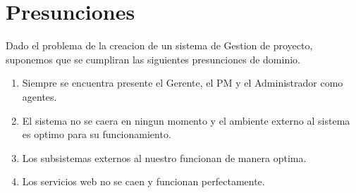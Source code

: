 \section{Presunciones}
Dado el problema de la creacion de un sistema de Gestion de proyecto, suponemos que se cumpliran las siguientes presunciones de dominio.

\begin{enumerate} 
\item Siempre se encuentra presente el Gerente, el PM y el Administrador como agentes.
\item El sistema no se caera en ningun momento y el ambiente externo al sistema es optimo para su funcionamiento.
\item Los subsistemas externos al nuestro funcionan de manera optima.
\item Los servicios web no se caen y funcionan perfectamente.
\end{enumerate} 
